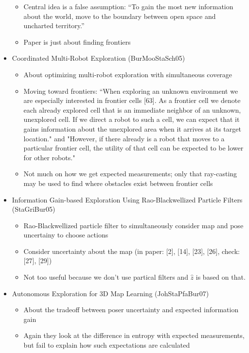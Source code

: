 \documentclass[10pt]{article}
\theoremstyle{plain}\theorembodyfont{\normalfont}
\begin{document}
\begin{itemize}
\begin{itemize}
		\item Central idea is a false assumption: ``To gain the most new information about the world, move to the boundary between open space and uncharted territory.''
		\item Paper is just about finding frontiers
	\end{itemize}
	\item Coordinated Multi-Robot Exploration (BurMooStaSch05)
	\begin{itemize}
		\item About optimizing multi-robot exploration with simultaneous coverage
		\item Moving toward frontiers: ``When exploring an unknown environment we are especially interested in frontier cells [63]. As a frontier cell we denote each already explored cell that is an immediate neighbor of an unknown, unexplored cell. If we direct a robot to such a cell, we can expect that it gains information about the unexplored area when it arrives at its target location." and "However, if there already is a robot that moves to a particular frontier cell, the utility of that cell can be expected to be lower for other robots."
		\item Not much on how we get expected measurements; only that ray-casting may be used to find where obstacles exist between frontier cells
	\end{itemize}	
	\item Information Gain-based Exploration Using Rao-Blackwellized Particle Filters (StaGriBur05)
	\begin{itemize}
		\item Rao-Blackwellized particle filter to simultaneously consider map and pose uncertainy to choose actions
		\item Consider uncertainty about the map (in paper: [2], [14], [23], [26], check: [27], [29])
		\item Not too useful because we don't use partical filters and $\hat z$ is based on that.
	\end{itemize}	
	\item Autonomous Exploration for 3D Map Learning (JohStaPfaBur07)
	\begin{itemize}
		\item About the tradeoff between poser uncertainty and expected information gain
		\item Again they look at the difference in entropy with expected measurements, but fail to explain how such expectations are calculated
	\end{itemize}	

\end{itemize}
\end{document}
